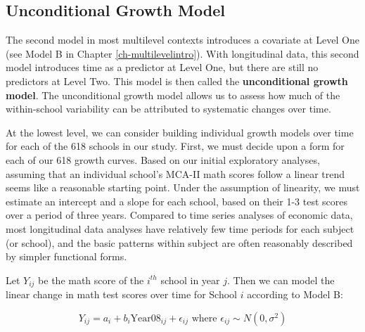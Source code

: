 \documentclass[
]{krantz}
\begin{document}
\hypertarget{modelb9}{%
\subsection{Unconditional Growth Model}\label{modelb9}}

The second model in most multilevel contexts introduces a covariate at Level One (see Model B in Chapter \ref{ch-multilevelintro}). With longitudinal data, this second model introduces time as a predictor at Level One, but there are still no predictors at Level Two. This model is then called the \textbf{unconditional growth model}.  The unconditional growth model allows us to assess how much of the within-school variability can be attributed to systematic changes over time.

At the lowest level, we can consider building individual growth models over time for each of the 618 schools in our study. First, we must decide upon a form for each of our 618 growth curves. Based on our initial exploratory analyses, assuming that an individual school's MCA-II math scores follow a linear trend seems like a reasonable starting point. Under the assumption of linearity, we must estimate an intercept and a slope for each school, based on their 1-3 test scores over a period of three years. Compared to time series analyses of economic data, most longitudinal data analyses have relatively few time periods for each subject (or school), and the basic patterns within subject are often reasonably described by simpler functional forms.

Let \(Y_{ij}\) be the math score of the \(i^{th}\) school in year \(j\). Then we can model the linear change in math test scores over time for School \(i\) according to Model B:

\begin{equation*}
Y_{ij} = a_{i} + b_{i}\textrm{Year08}_{ij} + \epsilon_{ij} \textrm{ where } \epsilon_{ij} \sim N(0, \sigma^2)
\end{equation*}
\end{document}
